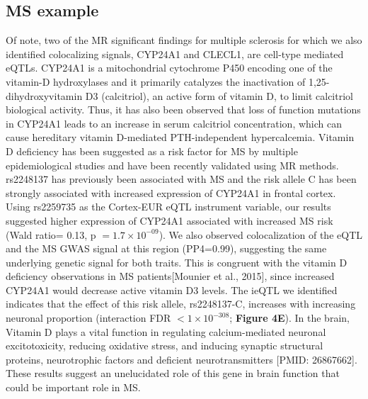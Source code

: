 \subsection{MS example}
Of note, two of the MR significant findings for multiple sclerosis for which we also identified colocalizing signals, CYP24A1 and CLECL1, are cell-type mediated eQTLs. CYP24A1 is a mitochondrial cytochrome P450 encoding one of the vitamin-D hydroxylases and it primarily catalyzes the inactivation of 1,25-dihydroxyvitamin D3 (calcitriol), an active form of vitamin D, to limit calcitriol biological activity\cite{jones25HydroxyvitaminD24hydroxylaseCYP24A12012}. Thus, it has also been observed that loss of function mutations in CYP24A1 leads to an increase in serum calcitriol concentration, which can cause hereditary vitamin D-mediated PTH-independent hypercalcemia\cite{schlingmannMutationsCYP24A1Idiopathic2011,cappellaniHereditaryHypercalcemiaCaused2019}. Vitamin D deficiency has been suggested as a risk factor for MS by multiple epidemiological studies\cite{agnelloCYP27A1CYP24A1RXRalpha2018,pierrot-deseillignyHypovitaminosisOneEnvironmental2010} and have been recently validated using MR methods\cite{agnelloCYP27A1CYP24A1RXRalpha2018}. rs2248137 has previously been associated with MS\cite{consortium*+MultipleSclerosisGenomic2019} and the risk allele C has been strongly associated with increased expression of CYP24A1 in frontal cortex\cite{ramasamyGeneticEvidencePathogenic2014}. Using rs2259735 as the Cortex-EUR eQTL instrument variable, our results suggested higher expression of CYP24A1 associated with increased MS risk (Wald ratio= 0.13, p $= 1.7 \times 10^{-09}$). We also observed colocalization of the eQTL and the MS GWAS signal at this region (PP4=0.99), suggesting the same underlying genetic signal for both traits. This is congruent with the vitamin D deficiency observations in MS patients[Mounier et al., 2015], since increased CYP24A1 would decrease active vitamin D3 levels. The ieQTL we identified indicates that the effect of this risk allele, rs2248137-C, increases with increasing neuronal proportion (interaction FDR $< 1 \times 10^{-308}$; \textbf{Figure 4E}). In the brain, Vitamin D plays a vital function in regulating calcium-mediated neuronal excitotoxicity, reducing oxidative stress, and inducing synaptic structural proteins, neurotrophic factors and deficient neurotransmitters [PMID: 26867662]. These results suggest an unelucidated role of this gene in brain function that could be important role in MS.  

